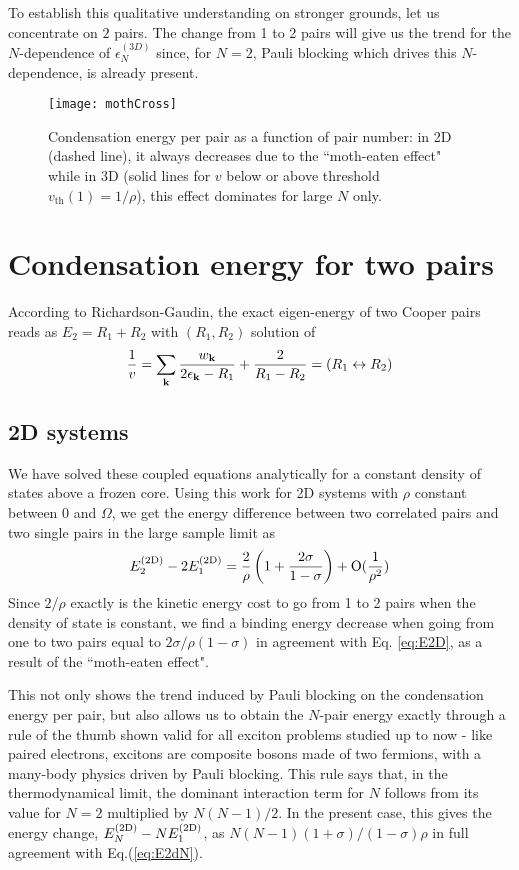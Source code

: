 \documentclass[5p,twocolumn]{elsarticle}
\begin{document}
To establish this qualitative understanding on stronger  grounds, let us concentrate on  $2$ pairs. The change from 1 to 2 pairs will give us the trend for the $N$-dependence of $\epsilon^{(3D)}_N$ since, for $N=2$, Pauli blocking which drives this $N$-dependence, is already present.  

\begin{figure}[htb]
	\centering
		\texttt{[image: mothCross]}
	\caption{Condensation energy per pair as a function of pair number: in 2D (dashed line), it always decreases due to the ``moth-eaten effect" while in 3D (solid lines for  $v$ below or above threshold $v_{\text{th}}(1)=1/\rho$), this effect dominates for large $N$ only.}
	\label{fig:3dCondChange}
\end{figure}

\section{Condensation energy for two pairs\label{sec:twoPair}}
According to Richardson-Gaudin, the exact eigen-energy of two Cooper pairs reads as $E_2=R_1+R_2$ with $(R_1,R_2)$ solution of
\begin{equation}
\frac{1}{v}=\sum_{\mathbf{k}}\frac{w_{\mathbf{k}}}{2\epsilon_{\mathbf{k}}-R_1}+\frac{2}{R_1-R_2}=(R_{1}\leftrightarrow{}R_{2})
\label{eq:richardsonEq}
\end{equation}

\subsection{2D systems}
We have solved these coupled equations analytically for a constant density of states above a frozen core\cite{combescotBCS}.  Using  this work  for 2D systems with $\rho$ constant between $0$ and $\Omega$, we get the energy difference between two correlated pairs and two single pairs in the large sample limit as 
\begin{equation}
E^{{{\text{(2D)}}}}_2-2E_1^{{{\text{(2D)}}}}=\frac{2}{\rho}\left(1+\frac{2\sigma}{1-\sigma}\right)+\text{O}(\frac{1}{\rho^2})
\end{equation}
 Since $2/\rho$ exactly is the kinetic energy cost to go from 1 to 2 pairs when the density of state is constant, we find a binding energy decrease when going from one to two pairs equal to $2\sigma/\rho(1-\sigma)$ in agreement with Eq. \ref{eq:E2D}, as a result of the ``moth-eaten effect". 

This not only shows the trend induced by Pauli blocking on the condensation energy per pair, but also allows us to obtain the $N$-pair energy exactly through a rule of the thumb shown valid for all exciton problems studied up to now - like paired electrons, excitons are composite bosons made of two fermions, with a many-body physics driven by Pauli blocking.  This rule says that, in the thermodynamical limit, the dominant interaction term for $N$ follows from its value for $N= 2$ multiplied by $N(N-1)/2$.  In the present case, this gives the energy change, $E^{{{\text{(2D)}}}}_N-NE^{{{\text{(2D)}}}}_1$, as $N(N-1)(1+\sigma)/(1-\sigma)\rho$ in full agreement with
Eq.(\ref{eq:E2dN}).
\end{document}
